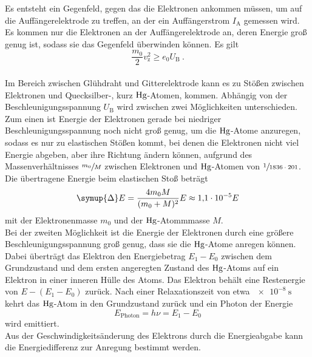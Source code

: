     Es entsteht ein Gegenfeld,
    gegen das die Elektronen ankommen müssen,
    um auf die Auffängerelektrode zu treffen,
    an der ein Auffängerstrom $I_\text{A}$ gemessen wird.
    Es kommen nur die Elektronen an der Auffängerelektrode an,
    deren Energie groß genug ist,
    sodass sie das Gegenfeld überwinden können. 
    Es gilt
    \begin{equation}
        \frac{m_0}{2}v^2_\text{z} \geq e_0 U_\text{B} \ .
        \label{eqn:energie_gegenfeld}
    \end{equation}
    \\
    Im Bereich zwischen Glühdraht und Gitterelektrode kann es zu Stößen zwischen Elektronen und Quecksilber-,
    kurz $\ce{Hg}$-Atomen,
    kommen.
    Abhängig von der Beschleunigungsspannung $U_\text{B}$ wird zwischen zwei Möglichkeiten unterschieden.\\
    Zum einen ist Energie der Elektronen gerade bei niedriger Beschleunigungsspannung noch nicht groß genug,
    um die $\ce{Hg}$-Atome anzuregen,
    sodass es nur zu elastischen Stößen kommt,
    bei denen die Elektronen nicht viel Energie abgeben,
    aber ihre Richtung ändern können,
    aufgrund des Massenverhältnisses $\sfrac{m_0}{M}$ zwischen Elektronen und $\ce{Hg}$-Atomen von $\sfrac{1}{1836\cdot201}$.
    Die übertragene Energie beim elastischen Stoß beträgt
    \begin{equation*}
        \symup{\Delta}E = \frac{4 m_0 M}{(m_0 + M)^2} E \approx \num{1.1e-5} E
    \end{equation*}
    mit der Elektronenmasse $m_0$ und der $\ce{Hg}$-Atommmasse $M$.\\
    Bei der zweiten Möglichkeit ist die Energie der Elektronen durch eine größere Beschleunigungsspannung groß genug,
    dass sie die $\ce{Hg}$-Atome anregen können.
    Dabei überträgt das Elektron den Energiebetrag $E_1 -E_0$ zwischen dem Grundzustand und dem ersten angeregten Zustand des $\ce{Hg}$-Atoms auf ein Elektron in einer inneren Hülle des Atoms.
    Das Elektron behält eine Restenergie von $E - (E_1 - E_0)$ zurück.
    Nach einer Relaxationszeit von etwa $\SI{e-8}{\second}$ kehrt das $\ce{Hg}$-Atom in den Grundzustand zurück und ein Photon der Energie
    \begin{equation*}
        E_\text{Photon} = h \nu = E_1 - E_0
    \end{equation*}
    wird emittiert.\\
    Aus der Geschwindigkeitsänderung des Elektrons durch die Energieabgabe kann die Energiedifferenz zur Anregung bestimmt werden.
